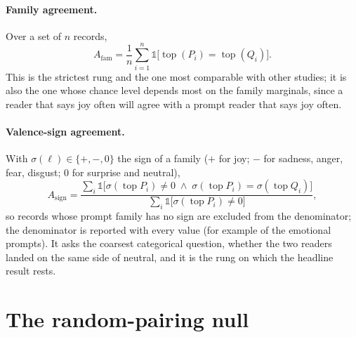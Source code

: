 \paragraph{Family agreement.} Over a set of $n$ records,
\begin{equation}
A_{\mathrm{fam}} = \frac{1}{n} \sum_{i=1}^{n} \mathbb{1}\bigl[\operatorname{top}(P_i) = \operatorname{top}(Q_i)\bigr].
\label{eq:family}
\end{equation}
This is the strictest rung and the one most comparable with other studies; it is also the one whose chance level depends most on the family marginals, since a reader that says joy often will agree with a prompt reader that says joy often.

\paragraph{Valence-sign agreement.} With $\sigma(\ell) \in \{+, -, 0\}$ the sign of a family ($+$ for joy; $-$ for sadness, anger, fear, disgust; $0$ for surprise and neutral),
\begin{equation}
A_{\mathrm{sign}} = \frac{\sum_{i} \mathbb{1}\bigl[\sigma(\operatorname{top} P_i) \neq 0 \;\wedge\; \sigma(\operatorname{top} P_i) = \sigma(\operatorname{top} Q_i)\bigr]}{\sum_{i} \mathbb{1}\bigl[\sigma(\operatorname{top} P_i) \neq 0\bigr]} ,
\label{eq:sign}
\end{equation}
so records whose prompt family has no sign are excluded from the denominator; the denominator is reported with every value (for example \FullEmoNSign{} of the \FullEmoN{} emotional prompts). It asks the coarsest categorical question, whether the two readers landed on the same side of neutral, and it is the rung on which the headline result rests.

\section{The random-pairing null}
\label{sec:method-null}

